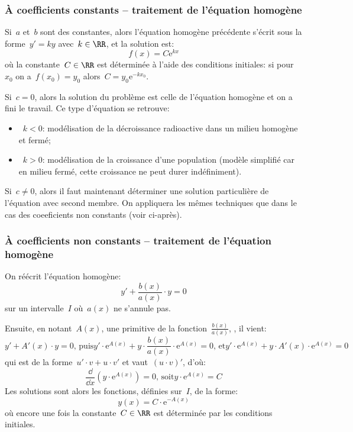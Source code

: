 \medskip
\subsubsection{À coefficients constants -- traitement de l'équation homogène}

Si~$a$ et~$b$ sont des constantes, alors l'équation homogène précédente s'écrit 
sous la forme~$y' = ky$ avec~$k\in\RR$, et la solution est:
\begin{equation}
  f(x) = C\mathrm{e}^{kx}
\end{equation}
où la constante~$C\in\RR$ est déterminée à l'aide des conditions initiales: 
si pour~$x_0$ on a~$f(x_0) = y_0$ alors~$C = y_0\mathrm{e}^{-kx_0}$.

\medskip
Si~$c=0$, alors la solution du problème est celle de l'équation homogène et on a fini
le travail. Ce type d'équation se retrouve:
\begin{itemize}
  \item~$k<0$: modélisation de la décroissance radioactive dans un milieu homogène et fermé;
  \item~$k>0$: modélisation de la croissance d'une population (modèle simplifié car en milieu
	fermé, cette croissance ne peut durer indéfiniment).
\end{itemize}

\medskip
Si~$c\ne0$, alors il faut maintenant déterminer une solution particulière de l'équation avec
second membre. On appliquera les mêmes techniques que dans le cas des coeeficients non 
constants (voir ci-après).


\medskip
\subsubsection{À coefficients non constants -- traitement de l'équation homogène}

On réécrit l'équation homogène:
\begin{equation}
  y' + \frac{b(x)}{a(x)} \cdot y = 0
\end{equation}
sur un intervalle~$I$ où~$a(x)$ ne s'annule pas.

Ensuite, en notant~$A(x)$, une primitive de la fonction~$\frac{b(x)}{a(x)}$, , il vient:
\begin{equation}
  y' + A'(x) \cdot y =0 
\text{, puis}
  y' \cdot \mathrm{e}^{A(x)} + y \cdot \frac{b(x)}{a(x)} \cdot \mathrm{e}^{A(x)} =0
\text{, et}
  y' \cdot \mathrm{e}^{A(x)} + y \cdot A'(x) \cdot \mathrm{e}^{A(x)}=0
\end{equation}
qui est de la forme~$u' \cdot v + u \cdot v'$ et vaut~$ (u \cdot v)'$, d'où:
\begin{equation}
  \frac{\dd}{\dd x}(y \cdot \mathrm{e}^{A(x)})=0
\text{, soit}
  y \cdot \mathrm{e}^{A(x)} = C
\end{equation}
Les solutions sont alors les fonctions, définies sur~$I$, de la forme:
\begin{equation}
  y(x) = C \cdot \mathrm{e}^{-A(x)}
\end{equation}
où encore une fois la constante~$C\in\RR$ est déterminée par les conditions initiales.


